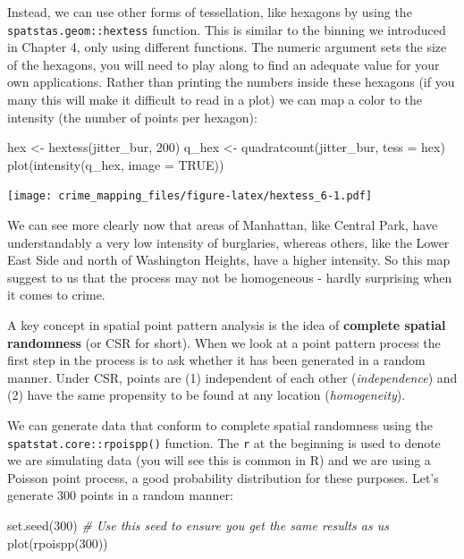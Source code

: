 \documentclass[
  krantz2]{krantz}
\makeatletter
\newenvironment{Shaded}{\begin{snugshade}}{\end{snugshade}}
\newcommand{\AttributeTok}[1]{\textcolor[rgb]{0.61,0.61,0.61}{#1}}
\newcommand{\CommentTok}[1]{\textcolor[rgb]{0.37,0.37,0.37}{\textit{#1}}}
\newcommand{\ConstantTok}[1]{\textcolor[rgb]{0,0,0}{#1}}
\newcommand{\DecValTok}[1]{\textcolor[rgb]{0.06,0.06,0.06}{#1}}
\newcommand{\FunctionTok}[1]{\textcolor[rgb]{0,0,0}{#1}}
\newcommand{\NormalTok}[1]{#1}
\newcommand{\OtherTok}[1]{\textcolor[rgb]{0.37,0.37,0.37}{#1}}
\newenvironment{kframe}{%
\medskip{}
\setlength{\fboxsep}{.8em}
 \def\at@end@of@kframe{}%
 \ifinner\ifhmode%
  \def\at@end@of@kframe{\end{minipage}}%
  \begin{minipage}{\columnwidth}%
 \fi\fi%
 \def\FrameCommand##1{\hskip\@totalleftmargin \hskip-\fboxsep
 \colorbox{shadecolor}{##1}\hskip-\fboxsep
     \hskip-\linewidth \hskip-\@totalleftmargin \hskip\columnwidth}%
 \MakeFramed {\advance\hsize-\width
   \@totalleftmargin\z@ \linewidth\hsize
   \@setminipage}}%
 {\par\unskip\endMakeFramed%
 \at@end@of@kframe}
\renewenvironment{Shaded}{\begin{kframe}}{\end{kframe}}
\makeatother
\begin{document}
Instead, we can use other forms of tessellation, like hexagons by using the \texttt{spatstas.geom::hextess} function. This is similar to the binning we introduced in Chapter 4, only using different functions. The numeric argument sets the size of the hexagons, you will need to play along to find an adequate value for your own applications. Rather than printing the numbers inside these hexagons (if you many this will make it difficult to read in a plot) we can map a color to the intensity (the number of points per hexagon):

\begin{Shaded}
\begin{Highlighting}[]
\NormalTok{hex }\OtherTok{\textless{}{-}} \FunctionTok{hextess}\NormalTok{(jitter\_bur, }\DecValTok{200}\NormalTok{)}
\NormalTok{q\_hex }\OtherTok{\textless{}{-}} \FunctionTok{quadratcount}\NormalTok{(jitter\_bur, }\AttributeTok{tess =}\NormalTok{ hex)}
\FunctionTok{plot}\NormalTok{(}\FunctionTok{intensity}\NormalTok{(q\_hex, }\AttributeTok{image =} \ConstantTok{TRUE}\NormalTok{))}
\end{Highlighting}
\end{Shaded}

\texttt{[image: crime\_mapping\_files/figure-latex/hextess\_6-1.pdf]}

We can see more clearly now that areas of Manhattan, like Central Park, have understandably a very low intensity of burglaries, whereas others, like the Lower East Side and north of Washington Heights, have a higher intensity. So this map suggest to us that the process may not be homogeneous - hardly surprising when it comes to crime.

A key concept in spatial point pattern analysis is the idea of \textbf{complete spatial randomness} (or CSR for short). When we look at a point pattern process the first step in the process is to ask whether it has been generated in a random manner. Under CSR, points are (1) independent of each other (\emph{independence}) and (2) have the same propensity to be found at any location (\emph{homogeneity}).

We can generate data that conform to complete spatial randomness using the \texttt{spatstat.core::rpoispp()} function. The \texttt{r} at the beginning is used to denote we are simulating data (you will see this is common in R) and we are using a Poisson point process, a good probability distribution for these purposes. Let's generate 300 points in a random manner:

\begin{Shaded}
\begin{Highlighting}[]
\FunctionTok{set.seed}\NormalTok{(}\DecValTok{300}\NormalTok{) }\CommentTok{\# Use this seed to ensure you get the same results as us}
\FunctionTok{plot}\NormalTok{(}\FunctionTok{rpoispp}\NormalTok{(}\DecValTok{300}\NormalTok{))}
\end{Highlighting}
\end{Shaded}
\end{document}

